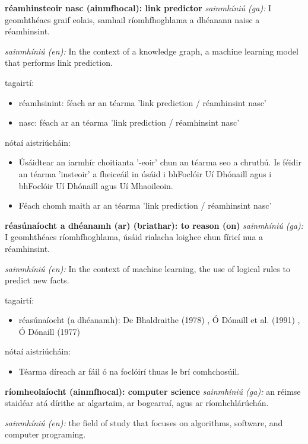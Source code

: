 \documentclass{article}
\begin{document}
\textbf{réamhinsteoir nasc (ainmfhocal): link predictor}
\textit{sainmhíniú (ga):} I gcomhthéacs graif eolais, samhail ríomhfhoghlama a dhéanann naisc a réamhinsint.

\textit{sainmhíniú (en):} In the context of a knowledge graph, a machine learning model that performs link prediction.

tagairtí:
\begin{itemize}
	\item réamhsinint: féach ar an téarma 'link prediction / réamhinsint nasc'
	\item nasc: féach ar an téarma 'link prediction / réamhinsint nasc'
\end{itemize}

nótaí aistriúcháin:
\begin{itemize}
	\item Úsáidtear an iarmhír choitianta '-eoir' chun an téarma seo a chruthú. Is féidir an téarma 'insteoir' a fheiceáil in úsáid i bhFoclóir Uí Dhónaill agus i bhFoclóir Uí Dhónaill agus Uí Mhaoileoin.
	\item Féach chomh maith ar an téarma 'link prediction / réamhinsint nasc'
\end{itemize}


\textbf{réasúnaíocht a dhéanamh (ar) (briathar): to reason (on)}
\textit{sainmhíniú (ga):} I gcomhthéacs ríomhfhoghlama, úsáid rialacha loighce chun fíricí nua a réamhinsint.

\textit{sainmhíniú (en):} In the context of machine learning, the use of logical rules to predict new facts.

tagairtí:
\begin{itemize}
	\item réasúnaíocht (a dhéanamh): De Bhaldraithe (1978) \cite{de-bhaldraithe}, Ó Dónaill et al. (1991) \cite{focloir-beag}, Ó Dónaill (1977) \cite{odonaill}
\end{itemize}

nótaí aistriúcháin:
\begin{itemize}
	\item Téarma díreach ar fáil ó na foclóirí thuas le brí comhchosúil.
\end{itemize}


\textbf{ríomheolaíocht (ainmfhocal): computer science}
\textit{sainmhíniú (ga):} an réimse staidéar atá dírithe ar algartaim, ar bogearraí, agus ar ríomhchlárúchán.

\textit{sainmhíniú (en):} the field of study that focuses on algorithms, software, and computer programing.
\end{document}
